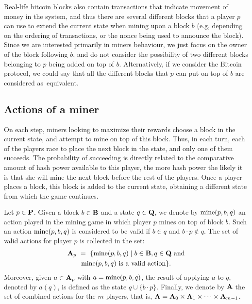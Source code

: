 Real-life bitcoin blocks also contain transactions that indicate movement of money in the system, and thus there are
several different blocks that a player $p$ can use to extend the current state when mining upon a block $b$ (e.g, depending  on the ordering of transactions, or the nonce being used to announce the block). Since we are interested primarily in miners behaviour, we just focus on the owner of the block following $b$, and do not consider the possibility of two different blocks belonging to $p$ being added on top of $b$. Alternatively, if we consider the Bitcoin protocol, we could say that all the different blocks that $p$ can put on top of $b$ are considered as~equivalent.

\subsection{Actions of a miner}\label{sub:actions}
On each step, miners looking to maximize their rewards choose a block in the current state, and attempt to mine on top of this block. Thus, in each turn, each of the players race to place the next block in the state, and only one of them succeeds. The probability of succeeding is directly related to the comparative amount of hash power available to this player, the more hash power the likely it is that she will mine the next block before the rest of the players. Once a player places a block, this block is added to the current state, obtaining a different state from which the game continues.

Let $p \in \mathbf{P}$. Given a block $b \in \mathbf{B}$ and a state $q \in \mathbf{Q}$, we denote by $\text{\rm mine}(p,b,q)$ an action played in the mining game in which player $p$ mines on top of block $b$. Such an action $\text{\rm mine}(p,b,q)$ is considered to be valid if $b \in q$ and $b\cdot p \not\in q$. The set of valid actions for player $p$ is collected in the set:
\begin{multline*}
\mathbf{A}_p \ = \ \{ \text{\rm mine}(p,b,q) \mid b \in \mathbf{B}, q \in \mathbf{Q} \text{ and}\\\text{\rm mine}(p,b,q) \text{ is a valid action}\}.
\end{multline*}
Moreover, given $a \in \mathbf{A}_p$ with $a = \text{\rm mine}(p,b,q)$, the result of applying $a$ to $q$, denoted by $a(q)$, is defined as the state $q \cup \{b \cdot p\}$. Finally, we denote by $\mathbf{A}$ the set of combined actions for the $m$ players, that is, $\mathbf{A} = \mathbf{A}_0 \times \mathbf{A}_1 \times \cdots \times \mathbf{A}_{m-1}$.


